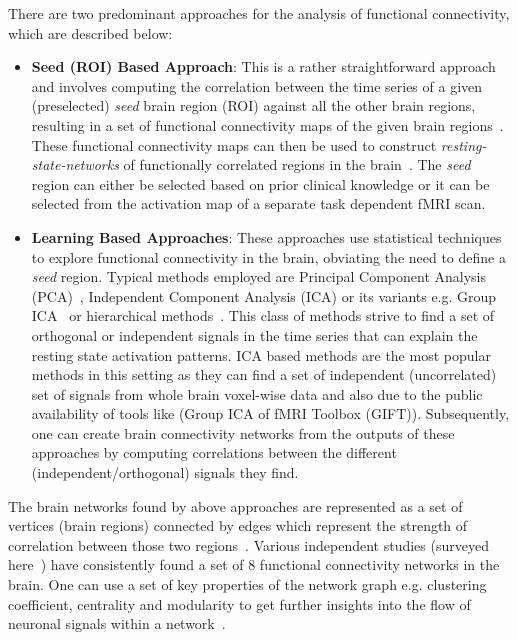 \documentclass{llncs}
\begin{document}
There are two predominant approaches for the analysis of functional connectivity, which are described below:
\begin{itemize}
\item {\bf Seed (ROI) Based Approach}:  This is a rather straightforward approach and involves computing the correlation between the time series of a given (preselected) {\it seed} brain region (ROI) against all the other brain regions, resulting in a set of functional connectivity maps of the given brain regions~\cite{biswal1997simultaneous,cordes2000mapping}. These functional connectivity maps can then be used to construct {\it resting-state-networks} of functionally correlated regions in the brain~\cite{damoiseaux2006consistent,fox2005human,beckmann2005investigations}. The {\it seed} region can either be selected based on prior clinical knowledge or it can be selected from the activation map of a separate task dependent fMRI scan.
\item {\bf Learning Based Approaches}: These approaches use statistical techniques to explore functional connectivity in the brain, obviating the need to define a {\it seed} region. Typical methods employed are Principal Component Analysis (PCA)~\cite{friston1998disconnection}, Independent Component Analysis (ICA) or its variants e.g. Group ICA~\cite{beckmann2005investigations,calhoun2001method,petrella2011default} or hierarchical methods~\cite{cordes2002hierarchical,salvador2005neurophysiological}. This class of methods strive to find a set of orthogonal or independent signals in the time series that can explain the resting state activation patterns. ICA based methods are the most popular methods in this setting as they can find a set of independent (uncorrelated) set of signals from whole brain voxel-wise data and also due to the public availability of  tools like (Group ICA of fMRI Toolbox (GIFT)). Subsequently, one can create brain connectivity networks from the outputs of these approaches by computing correlations between the different (independent/orthogonal) signals they find.
 \end{itemize} 


The brain networks found by above approaches are represented as a set of vertices (brain regions) connected by edges which represent the strength of correlation between those two regions~\cite{he2010graph,stam2007graph}. Various independent studies (surveyed here~\cite{van2010exploring}) have consistently found a set of 8 functional connectivity networks in the brain. One can use a set of key properties of the network graph e.g. clustering coefficient, centrality and modularity to get further insights into the flow of neuronal signals within a network~\cite{he2010graph,stam2007graph}.
\end{document}
